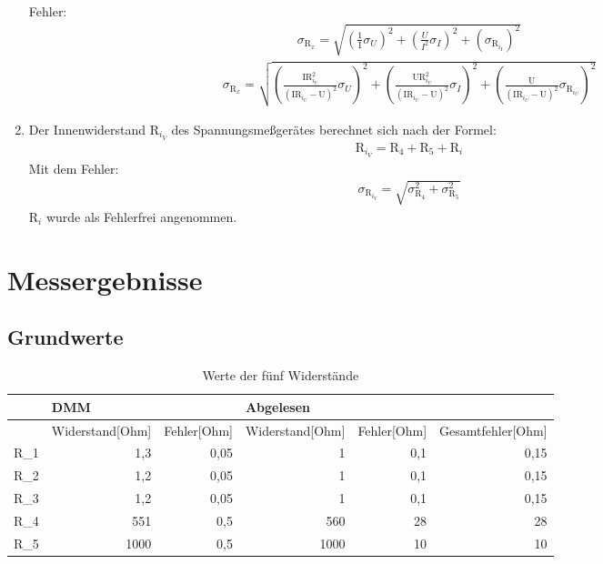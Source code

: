 \documentclass[12pt]{scrartcl}
\begin{document}
\begin{enumerate}
	Fehler:
	\begin{align}
	\sigma_{\text{R}_x}=
	\sqrt{\left(\frac{1}								{\text{I}}\sigma_U\right)^2+
	\left(\frac{U}{I^2}\sigma_I\right)^2+
	\left(\sigma_{\text{R}_{i_I}}\right)^2}
	\label{eqn:aufgabe_3_schaltung_2_sigma}
	\end{align}		
	\begin{align}
	\sigma_{\text{R}_x}=
	\sqrt{\left(\frac{\text{I}
	\text{R}_{i_U}^2}								{(\text{I}\text{R}_{i_U}-
	\text{U})^2}\sigma_U\right)^2+
	\left(\frac{\text{U}\text{R}_{i_U}^2}			{(\text{I}\text{R}_{i_U}-
	\text{U})^2}\sigma_I\right)^2+
	\left(\frac{\text{U}}							{(\text{I}\text{R}_{i_U}-
	\text{U})^2}\sigma_{
	\text{R}_{i_U}}\right)^2}
	\label{eqn:aufgabe_3_schaltung_1_sigma}
	\end{align}	 
	\item
	Der Innenwiderstand R$_{i_V}$ des Spannungsmeßgerätes berechnet sich nach der Formel:
	\begin{align}
	\text{R}_{i_V} = \text{R}_4 + \text{R}_5 + \text{R}_i 
	\label{eqn:aufgabe_4}
	\end{align}
	Mit dem Fehler:
	\begin{align}
	\sigma_{\text{R}_{i_V}} = \sqrt{\sigma_{\text{R}_4}^2 + \sigma_{\text{R}_5}^2}
	\label{eqn:aufgabe_4_sigma}
	\end{align}
	R$_i$ wurde als Fehlerfrei angenommen.
	
\end{enumerate}


\section{Messergebnisse}

\subsection{Grundwerte}
\begin{table}[htbp]
\caption{Werte der fünf Widerstände}
\centering
\begin{tabular}{|l|r|r|r|r|r|}
\hline
 & \multicolumn{1}{l|}{DMM} & \multicolumn{1}{l|}{} & \multicolumn{1}{l|}{Abgelesen} & \multicolumn{1}{l|}{} & \multicolumn{1}{l|}{} \\ \hline
 & \multicolumn{1}{l|}{Widerstand[Ohm]} & \multicolumn{1}{l|}{Fehler[Ohm]} & \multicolumn{1}{l|}{Widerstand[Ohm]} & \multicolumn{1}{l|}{Fehler[Ohm]} & \multicolumn{1}{l|}{Gesamtfehler[Ohm]} \\ \hline
R\_1 & 1,3 & 0,05 & 1 & 0,1 & 0,15 \\ \hline
R\_2 & 1,2 & 0,05 & 1 & 0,1 & 0,15 \\ \hline
R\_3 & 1,2 & 0,05 & 1 & 0,1 & 0,15 \\ \hline
R\_4 & 551 & 0,5 & 560 & 28 & 28 \\ \hline
R\_5 & 1000 & 0,5 & 1000 & 10 & 10 \\ \hline
\end{tabular}
\label{grundwerte}
\end{table}
\end{document}
